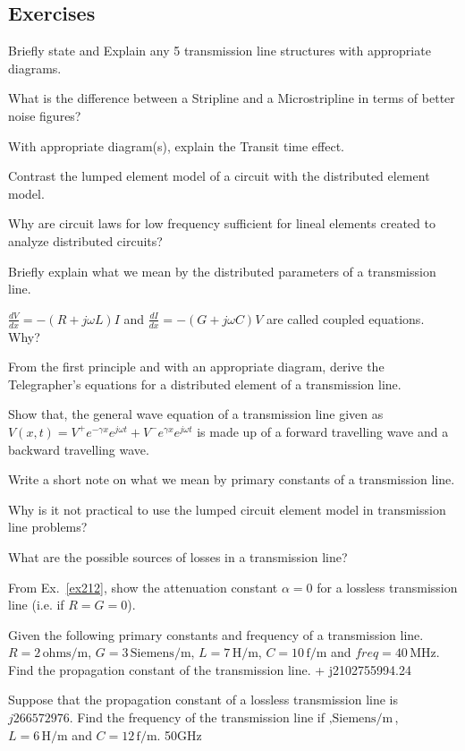 \begin{mdframed}[backgroundcolor=lightblue, linewidth=1pt, hidealllines=true]
\section*{Exercises}
\begin{ExerciseList}
\Exercise[label={ex21}] 
Briefly state and Explain any 5 transmission line structures with appropriate diagrams.

\Exercise[label={ex22}] 
What is the difference between a Stripline and a Microstripline in terms of better noise figures?

\Exercise[label={ex23}] 
With appropriate diagram(s), explain the Transit time effect.

\Exercise[label={ex24}] 
Contrast the lumped element model of a circuit with the distributed element model.

\Exercise[label={ex25}] 
Why are circuit laws for low frequency sufficient for lineal elements created to analyze distributed circuits?

\Exercise[label={ex26}] 
Briefly explain what we mean by the distributed parameters of a transmission line.

\Exercise[label={ex27}] 
$\frac{dV}{dx} = -(R + j\omega L)I$ and  $ \frac{dI}{dx} = -(G + j\omega C)V$ are called coupled equations. Why?

\Exercise[label={ex28}] 
From the first principle and with an appropriate diagram, derive the Telegrapher's equations for a distributed element of a transmission line.

\Exercise[label={ex29}] 
Show that, the general wave equation of a transmission line given as $ V(x,t) = V^{+} e^{-\gamma x}e^{j\omega t} + V^{-} e^{\gamma x}e^{j\omega t} $ is made up of a forward travelling wave and a backward travelling wave.

\Exercise[label={ex210}] 
Write a short note on what we mean by primary constants of a transmission line.

\Exercise[label={ex211}] 
Why is it not practical to use the lumped circuit element model in transmission line problems?

\Exercise[label={ex212}] 
What are the possible sources of losses in a transmission line?

\Exercise[label={ex217}]
From Ex.~\ref{ex212}, show the attenuation constant $\alpha=0$ for a lossless transmission line (i.e. if $R=G=0$).

\Exercise[label={ex217}]
Given the following primary constants and frequency of a transmission line. $R=2\, \text{ohms/m}$, $G=3\, \text{Siemens/m}$, $L=7\, \text{H/m}$, $C=10\, \text{f/m}$ and $freq=40\, \text{MHz}$. Find the propagation constant of the transmission line.
 + j2102755994.24

\Exercise[label={ex217}]
Suppose that the propagation constant of a lossless transmission line is $j266572976$. Find the frequency of the transmission line if $, \text{Siemens/m}$, $L=6\, \text{H/m}$ and $C=12\, \text{f/m}$.
\Answer 50GHz 
\end{ExerciseList}
\end{mdframed}
